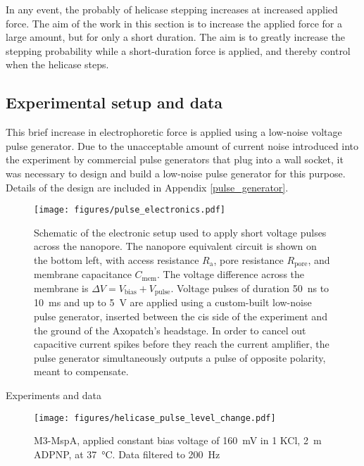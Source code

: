 In any event, the probably of helicase stepping increases at increased applied force.  The aim of the work in this section is to increase the applied force for a large amount, but for only a short duration.  The aim is to greatly increase the stepping probability while a short-duration force is applied, and thereby control when the helicase steps.

\subsection{Experimental setup and data}

This brief increase in electrophoretic force is applied using a low-noise voltage pulse generator.  Due to the unacceptable amount of current noise introduced into the experiment by commercial pulse generators that plug into a wall socket, it was necessary to design and build a low-noise pulse generator for this purpose.  Details of the design are included in Appendix \ref{pulse_generator}.

\begin{figure}[h]
\begin{centering}
\texttt{[image: figures/pulse\_electronics.pdf]}
\caption[Electronic setup for low-noise pulses across a nanopore]{Schematic of the electronic setup used to apply short voltage pulses across the nanopore.  The nanopore equivalent circuit is shown on the bottom left, with access resistance $R_{\text{a}}$, pore resistance $R_{\text{pore}}$, and membrane capacitance $C_{\text{mem}}$.  The voltage difference across the membrane is $\Delta V = V_{\text{bias}} + V_{\text{pulse}}$.  Voltage pulses of duration \SI{50}{\ns} to \SI{10}{\ms} and up to \SI{5}{\V} are applied using a custom-built low-noise pulse generator, inserted between the cis side of the experiment and the ground of the Axopatch's headstage.  In order to cancel out capacitive current spikes before they reach the current amplifier, the pulse generator simultaneously outputs a pulse of opposite polarity, meant to compensate.}
\label{fig:helicase_pulse_setup}
\end{centering}
\end{figure}

Experiments and data

\begin{figure}[h]
\begin{centering}
\texttt{[image: figures/helicase\_pulse\_level\_change.pdf]}
\caption[Voltage pulse can induce a helicase step]{M3-MspA, applied constant bias voltage of \SI{160}{\mV} in \SI{1}{\Molar} KCl, \SI{2}{\m\Molar} ADPNP, at \SI{37}{\celsius}. Data filtered to \SI{200}{\Hz}}
\label{fig:helicase_pulse}
\end{centering}
\end{figure}

